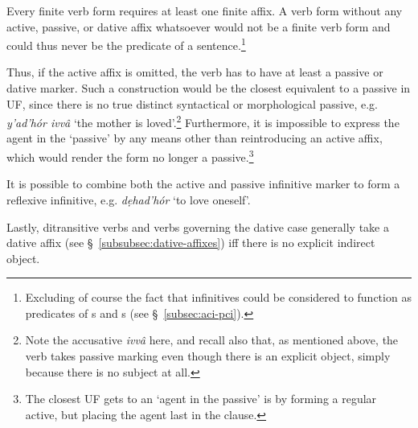 \documentclass[a4paper, 12pt, twoside, openright, final]{book}
\let \w \textit
\begin{document}
Every finite verb form requires at least one finite affix. A verb form without any active, passive, or dative affix whatsoever
would not be a finite verb form and could thus never be the predicate of a sentence.\footnote{Excluding of course the fact
that infinitives could be considered to function as predicates of s and s (see §~\ref{subsec:aci-pci}).}

Thus, if the active affix is omitted, the verb has to have at least a passive or dative marker.
Such a construction would be the closest equivalent to a passive in UF, since there is
no true distinct syntactical or morphological passive, e.g. \w{y’ad’hór ivvâ} ‘the mother is loved’.\footnote{Note the accusative
\textit{ivvâ} here, and recall also that, as mentioned above, the verb takes passive marking even though there is an explicit
object, simply because there is no subject at all.} Furthermore, it is impossible to express the agent
in the ‘passive’ by any
means other than reintroducing an active affix, which would render the form no longer a passive.\footnote{The closest
UF gets to an ‘agent in the passive’ is by forming a regular active, but placing the agent last in the clause.}

It is possible to combine both the active and passive infinitive marker to form a reflexive infinitive, e.g. \w{dẹhad’hór}
‘to love oneself’.

Lastly, ditransitive verbs and verbs governing the dative case generally take a dative affix (see
§~\ref{subsubsec:dative-affixes}) iff there is no explicit indirect object.
\end{document}
